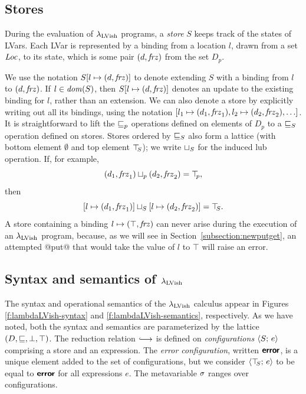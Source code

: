 \documentclass{article}
\begin{document}
\subsection{Stores}

During the evaluation of $\lambda_{\textrm{LVish}}$ programs, a \emph{store} $S$
keeps track of the states of LVars.  Each LVar is represented by a
binding from a location $l$, drawn from a set $\mathit{Loc}$, to its state,
which is some pair $(d, \mathit{frz})$ from the set $D_p$.

We use the notation $S[l \mapsto (d, \mathit{frz})]$ to denote extending $S$
with a binding from $l$ to $(d, \mathit{frz})$.  If $l \in \mathit{dom}(S)$,
then $S[l \mapsto (d, \mathit{frz})]$ denotes an update to the existing
binding for $l$, rather than an extension.  We can also denote a store
by explicitly writing out all its bindings, using the notation
$\store{\storebinding{l_1}{d_1}{\status_1},
  \storebinding{l_2}{d_2}{\status_2}, \dots}$.  It is straightforward
to lift the $\sqsubseteq_p$ operations defined on elements of $D_p$ to a
$ \sqsubseteq_S $ operation defined on stores.  Stores ordered by
$ \sqsubseteq_S $ also form a lattice (with bottom element $\emptyset$
and top element $\top\hspace{-0.85mm}_{S}$); we write $ \sqcup_{S} $ for the induced lub
operation. If, for example,
\[ (d_1, \mathit{frz}_1) \sqcup_p (d_2, \mathit{frz}_2) = \top\hspace{-0.85mm}_{p}, \]
then
\[ \left[ l \mapsto (d_1, \mathit{frz}_1) \right] \sqcup_{S} \left[ l \mapsto (d_2, \mathit{frz}_2) \right] =
\top\hspace{-0.85mm}_{S}. \] A store containing a binding
$l \mapsto (\top, \mathit{frz})$ can never arise during the execution
of an $\lambda_{\textrm{LVish}}$ program, because, as we will see in
Section~\ref{subsection:newputget}, an attempted @put@ that would
take the value of $l$ to $\top$ will raise an error.

\subsection{Syntax and semantics of $\lambda_{\textrm{LVish}}$}

\FigLambdaLVishGrammar[t]

\FigLambdaLVishSemantics[t]

The syntax and operational semantics of the $\lambda_{\textrm{LVish}}$ calculus
appear in Figures \ref{f:lambdaLVish-syntax} and
\ref{f:lambdaLVish-semantics}, respectively.  As we have noted, both
the syntax and semantics are parameterized by the lattice $(D,
\sqsubseteq, \bot, \top)$.  The reduction relation $\parstepsto$ is
defined on \emph{configurations} $\langle S;\, e \rangle$ comprising a store
and an expression.  The \emph{error configuration}, written $\textbf{\textsf{error}}$,
is a unique element added to the set of configurations, but we
consider $\langle \top\hspace{-0.85mm}_{S};\, e \rangle$ to be equal to $\textbf{\textsf{error}}$ for all
expressions $e$.  The metavariable $\sigma$ ranges over configurations.
\end{document}
